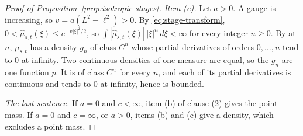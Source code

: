 \begin{proof}[Proof of Proposition~\ref{prop:isotropic-stages}]
\emph{Item (c).} Let $a > 0$. A gauge is increasing, so $v = a(L^2 - \ell^2) > 0$. By
\ref{eq:stage-transform}, $0 < \widehat\mu_{s,t}(\xi) \le e^{-v|\xi|^2/2}$, so
$\int|\widehat\mu_{s,t}(\xi)|\,|\xi|^n\,d\xi < \infty$ for every integer $n \ge 0$. By 
at $n$, $\mu_{s,t}$ has a density $g_n$ of class $C^n$ whose partial derivatives of orders
$0,\dots,n$ tend to $0$ at infinity. Two continuous densities of one measure are equal, so the
$g_n$ are one function $p$. It is of class $C^n$ for every $n$, and each of its partial
derivatives is continuous and tends to $0$ at infinity, hence is bounded.

\emph{The last sentence.} If $a = 0$ and $c < \infty$, item (b) of clause (2) gives
the point mass. If $a = 0$ and $c = \infty$, or $a > 0$, items (b) and (c) give a density,
which excludes a point mass.
\end{proof}
